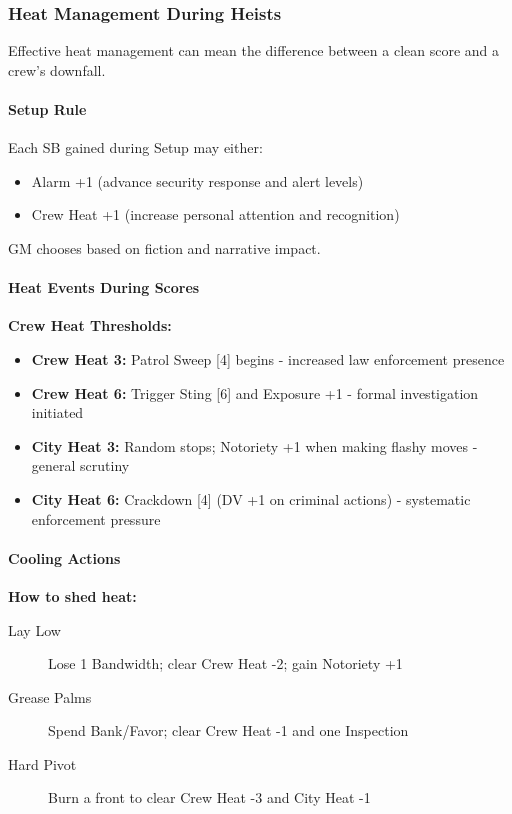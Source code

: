 \documentclass[11pt]{article}
\begin{document}
\subsubsection{Heat Management During Heists}

Effective heat management can mean the difference between a clean score and a crew's downfall.

\paragraph{Setup Rule}

Each SB gained during Setup may either:
\begin{itemize}
    \item Alarm +1 (advance security response and alert levels)
    \item Crew Heat +1 (increase personal attention and recognition)
\end{itemize}
GM chooses based on fiction and narrative impact.

\paragraph{Heat Events During Scores}

\textbf{Crew Heat Thresholds:}
\begin{itemize}
    \item \textbf{Crew Heat 3:} Patrol Sweep [4] begins - increased law enforcement presence
    \item \textbf{Crew Heat 6:} Trigger Sting [6] and Exposure +1 - formal investigation initiated
    \item \textbf{City Heat 3:} Random stops; Notoriety +1 when making flashy moves - general scrutiny
    \item \textbf{City Heat 6:} Crackdown [4] (DV +1 on criminal actions) - systematic enforcement pressure
\end{itemize}

\paragraph{Cooling Actions}
\textbf{How to shed heat:}
\begin{description}
    \item[Lay Low] Lose 1 Bandwidth; clear Crew Heat -2; gain Notoriety +1
    \item[Grease Palms] Spend Bank/Favor; clear Crew Heat -1 and one Inspection
    \item[Hard Pivot] Burn a front to clear Crew Heat -3 and City Heat -1
\end{description}
\end{document}
